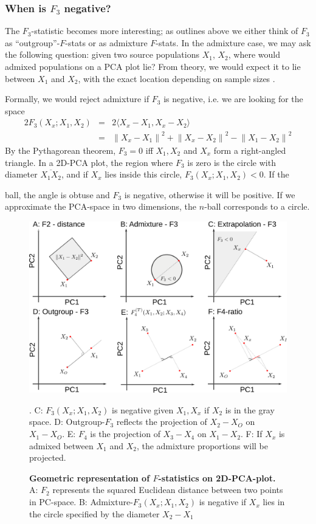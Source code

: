 \documentclass[12pt,a4pape, fullpage]{article}
\newcommand{\normsq}[1]{\left\lVert#1\right\rVert^2}
\begin{document}
\subsubsection{When is $F_3$ negative?}
The $F_3$-statistic becomes more interesting; as outlines above we either think of $F_3$ as ``outgroup''-$F$-stats or as admixture $F$-stats. In the admixture case, we may ask the following question: given two source populations $X_1$, $X_2$, where would admixed populations on a PCA plot lie? From theory, we would expect it to lie between $X_1$ and $X_2$, with the exact location depending on sample sizes \cite{brisbin2012, mcvean2009}. 

Formally, we would reject admixture if $F_3$ is negative, i.e. we are looking for the space
\begin{eqnarray}
2 F_3(X_x; X_1, X_2) &=& 2\langle  X_x - X_1, X_x - X_2 \rangle \nonumber\\
      &=& \normsq{X_x - X_1} + \normsq{X_x - X_2}  - \normsq{X_1 - X_2} 
\end{eqnarray}
By the Pythagorean theorem, $F_3 = 0 $ iff $X_1, X_2$ and $X_x$ form a right-angled triangle. In a 2D-PCA plot, the region where $F_3$ is zero is the circle  with diameter $\overline{X_1X_2}$, and if $X_x$ lies inside this circle, $F_3(X_x; X_1, X_2) < 0$. If the 

ball, the angle is obtuse and $F_3$ is negative, otherwise it will be positive. If we approximate the PCA-space in two dimensions, the $n$-ball corresponds to a circle. 

\begin{figure}[!ht]
	\includegraphics[width=\textwidth]{dummy_pca.png}
	\caption{\textbf{Geometric representation of $F$-statistics on 2D-PCA-plot.} A: $F_2$ represents the squared Euclidean distance between two points in PC-space. B: Admixture-$F_3(X_x; X_1, X_2)$ is negative if $X_x$ lies in the circle specified by the diameter $X_2-X_1$}. C: $F_3(X_x; X_1, X_2)$ is negative given $X_1, X_x$ if $X_2$ is in the gray space.  D: Outgroup-$F_3$ reflects the projection of $X_2 - X_O$ on $X_1 - X_O$. E: $F_4$ is the projection of $X_3 - X_4$ on $X_1-X_2$. F: If $X_x$ is admixed between $X_1$ and $X_2$, the admixture proportions will be projected.
\end{figure}
\end{document}
